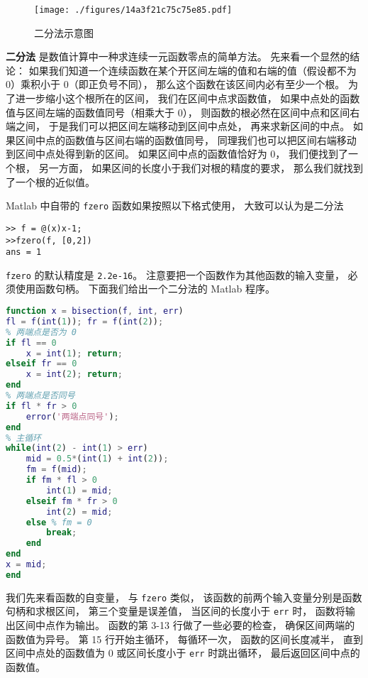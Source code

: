 
\begin{figure}[ht]
\centering
\texttt{[image: ./figures/14a3f21c75c75e85.pdf]}
\caption{二分法示意图} \label{fig_Bisec_1}
\end{figure}


\textbf{二分法} 是数值计算中一种求连续一元函数零点的简单方法。 先来看一个显然的结论： 如果我们知道一个连续函数在某个开区间左端的值和右端的值（假设都不为 0）乘积小于 0（即正负号不同）， 那么这个函数在该区间内必有至少一个根。 为了进一步缩小这个根所在的区间， 我们在区间中点求函数值， 如果中点处的函数值与区间左端的函数值同号（相乘大于 0）， 则函数的根必然在区间中点和区间右端之间， 于是我们可以把区间左端移动到区间中点处， 再来求新区间的中点。 如果区间中点的函数值与区间右端的函数值同号， 同理我们也可以把区间右端移动到区间中点处得到新的区间。 如果区间中点的函数值恰好为 0， 我们便找到了一个根， 另一方面， 如果区间的长度小于我们对根的精度的要求， 那么我们就找到了一个根的近似值。

Matlab 中自带的 \verb|fzero| 函数如果按照以下格式使用， 大致可以认为是二分法
\begin{lstlisting}[language=matlabC]
>> f = @(x)x-1;
>>fzero(f, [0,2])
ans = 1
\end{lstlisting}
\verb|fzero| 的默认精度是 \verb|2.2e-16|。 注意要把一个函数作为其他函数的输入变量， 必须使用函数句柄。 下面我们给出一个二分法的 Matlab 程序。

\begin{lstlisting}[language=matlab, caption=bisection.m]
% 二分法求函数的根
function x = bisection(f, int, err)
fl = f(int(1)); fr = f(int(2));
% 两端点是否为 0
if fl == 0
    x = int(1); return;
elseif fr == 0
    x = int(2); return;
end
% 两端点是否同号
if fl * fr > 0
    error('两端点同号');
end
% 主循环
while(int(2) - int(1) > err)
    mid = 0.5*(int(1) + int(2));
    fm = f(mid);
    if fm * fl > 0
        int(1) = mid;
    elseif fm * fr > 0
        int(2) = mid;
    else % fm = 0
        break;
    end
end
x = mid;
end
\end{lstlisting}

我们先来看函数的自变量， 与 \verb|fzero| 类似， 该函数的前两个输入变量分别是函数句柄和求根区间， 第三个变量是误差值， 当区间的长度小于 \verb|err| 时， 函数将输出区间中点作为输出。 函数的第 3-13 行做了一些必要的检查， 确保区间两端的函数值为异号。 第 15 行开始主循环， 每循环一次， 函数的区间长度减半， 直到区间中点处的函数值为 0 或区间长度小于 \verb|err| 时跳出循环， 最后返回区间中点的函数值。
